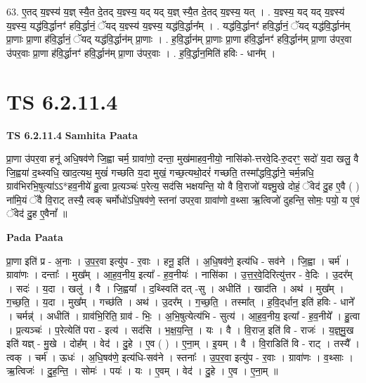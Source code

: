 \documentclass[17pt]{extarticle}
\begin{document}
63. ए॒तद् य॒ज्ञ्स्य॑ य॒ज्ञ् स्यै॒त दे॒तद् य॒ज्ञ्स्य॒ यद् यद् य॒ज्ञ् स्यै॒त दे॒तद् य॒ज्ञ्स्य॒ यत् । . य॒ज्ञ्स्य॒ यद् यद् य॒ज्ञ्स्य॑ य॒ज्ञ्स्य॒ यद्ध॑वि॒र्द्धानꣳ॑ हवि॒र्द्धानं॒ ॅयद् य॒ज्ञ्स्य॑ य॒ज्ञ्स्य॒ यद्ध॑वि॒र्द्धान᳚म् । . यद्ध॑वि॒र्द्धानꣳ॑ हवि॒र्द्धानं॒ ॅयद् यद्ध॑वि॒र्द्धान॑म् प्रा॒णाः प्रा॒णा ह॑वि॒र्द्धानं॒ ॅयद् यद्ध॑वि॒र्द्धान॑म् प्रा॒णाः । . ह॒वि॒र्द्धान॑म् प्रा॒णाः प्रा॒णा ह॑वि॒र्द्धानꣳ॑ हवि॒र्द्धान॑म् प्रा॒णा उ॑पर॒वा उ॑पर॒वाः प्रा॒णा ह॑वि॒र्द्धानꣳ॑ हवि॒र्द्धान॑म् प्रा॒णा उ॑पर॒वाः । . ह॒वि॒र्द्धान॒मिति॑ हविः - धान᳚म् । \newline
\pagebreak
{}

\section{ TS 6.2.11.4 }

\textbf{TS 6.2.11.4 } \newline
\textbf{Samhita Paata} \newline

प्रा॒णा उ॑पर॒वा हनू॑ अधि॒षव॑णे जि॒ह्वा चर्म॒ ग्रावा॑णो॒ दन्ता॒ मुख॑माहव॒नीयो॒ नासि॑को-त्तरवे॒दि-रु॒दरꣳ॒॒ सदो॑ य॒दा खलु॒ वै जि॒ह्वया॑ द॒थ्स्वधि॒ खाद॒त्यथ॒ मुखं॑ गच्छति य॒दा मुखं॒ गच्छ॒त्यथो॒दरं॑ गच्छति॒ तस्मा᳚द्धवि॒र्द्धाने॒ चर्म॒न्नधि॒ ग्राव॑भिरभि॒षुत्या॑ऽऽ*हव॒नीये॑ हु॒त्वा प्र॒त्यञ्चः॑ प॒रेत्य॒ सद॑सि भक्षयन्ति॒ यो वै वि॒राजो॑ यज्ञ्मु॒खे दोहं॒ ॅवेद॑ दु॒ह ए॒वै ( ) ना॑मि॒यं ॅवै वि॒राट् तस्यै॒ त्वक् चर्मोधो॑ऽधि॒षव॑णे॒ स्तना॑ उपर॒वा ग्रावा॑णो व॒थ्सा ऋ॒त्विजो॑ दुहन्ति॒ सोमः॒ पयो॒ य ए॒वं ॅवेद॑ दु॒ह ए॒वैनां᳚ ॥ \newline

\textbf{Pada Paata} \newline

प्रा॒णा इति॑ प्र - अ॒नाः । उ॒प॒र॒वा इत्यु॑प - र॒वाः । हनू॒ इति॑ । अ॒धि॒षव॑णे॒ इत्य॑धि - सव॑ने । जि॒ह्वा । चर्म॑ । ग्रावा॑णः । दन्ताः᳚ । मुख᳚म् । आ॒ह॒व॒नीय॒ इत्या᳚ - ह॒व॒नीयः॑ । नासि॑का । उ॒त्त॒र॒वे॒दिरित्यु॑त्तर - वे॒दिः । उ॒दर᳚म् । सदः॑ । य॒दा । खलु॑ । वै । जि॒ह्वया᳚ । द॒थ्स्विति॑ दत् -सु । अधीति॑ । खाद॑ति । अथ॑ । मुख᳚म् । ग॒च्छ॒ति॒ । य॒दा । मुख᳚म् । गच्छ॑ति । अथ॑ । उ॒दर᳚म् । ग॒च्छ॒ति॒ । तस्मा᳚त् । ह॒वि॒द्‌र्धान॒ इति॑ हविः - धाने᳚ । चर्मन्न्॑ । अधीति॑ । ग्राव॑भि॒रिति॒ ग्राव॑ - भिः॒ । अ॒भि॒षुत्येत्य॑भि - सुत्य॑ । आ॒ह॒व॒नीय॒ इत्या᳚ - ह॒व॒नीये᳚ । हु॒त्वा । प्र॒त्यञ्चः॑ । प॒रेत्येति॑ परा - इत्य॑ । सद॑सि । भ॒क्ष॒य॒न्ति॒ । यः । वै । वि॒राज॒ इति॑ वि - राजः॑ । य॒ज्ञ्॒मु॒ख इति॑ यज्ञ् - मु॒खे । दोह᳚म् । वेद॑ । दु॒हे । ए॒व ( ) । ए॒ना॒म् । इ॒यम् । वै । वि॒राडिति॑ वि - राट् । तस्यै᳚ । त्वक् । चर्म॑ । ऊधः॑ । अ॒धि॒षव॑णे॒ इत्य॑धि-सव॑ने । स्तनाः᳚ । उ॒प॒र॒वा इत्यु॑प - र॒वाः । ग्रावा॑णः । व॒थ्साः । ऋ॒त्विजः॑ । दु॒ह॒न्ति॒ । सोमः॑ । पयः॑ । यः । ए॒वम् । वेद॑ । दु॒हे । ए॒व । ए॒ना॒म् ॥  \newline
\end{document}
